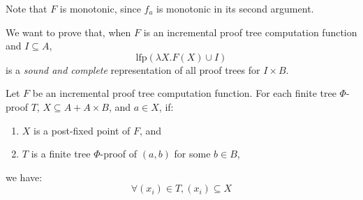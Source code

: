 \documentclass[12pt]{article}
\begin{document}
Note that $F$ is monotonic, since $f_a$ is monotonic in its second argument.

We want to prove that, when $F$ is an incremental proof tree computation function and $I\subseteq A$,
\[\text{lfp}(\lambda X.F(X)\cup I)\]
is a \emph{sound and complete} representation of all proof trees for $I\times B$.

\begin{theorem}[Soundness]
	Let $F$ be an incremental proof tree computation function.
	For each finite tree $\Phi$-proof $T$, $X\subseteq A+A\times B$, and $a\in X$, if:
	\begin{enumerate}
		\item $X$ is a post-fixed point of $F$, and
		\item $T$ is a finite tree $\Phi$-proof of $(a,b)$ for some $b\in B$,
	\end{enumerate}
	we have:
	\[\forall(x_i)\in T,(x_i)\subseteq X\]
\end{theorem}
\end{document}
